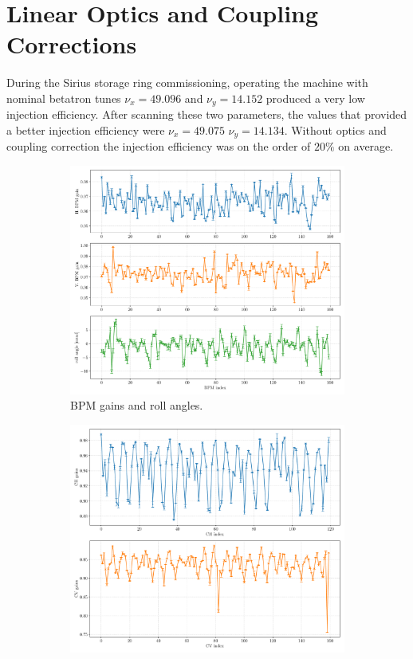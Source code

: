 \section{Linear Optics and Coupling Corrections}
During the Sirius storage ring commissioning, operating the machine with nominal betatron tunes $\nu_x = 49.096$ and $\nu_y = 14.152$ produced a very low injection efficiency. After scanning these two parameters, the values that provided a better injection efficiency were $\nu_x = 49.075$ $\nu_y = 14.134$. Without optics and coupling correction the injection efficiency was on the order of $20\%$ on average.

\begin{figure}
\centering
\begin{subfigure}[t]{0.49\textwidth}
\includegraphics[width=1.0\textwidth]{figures/bpm_gains_iter0_grid.pdf}
    \caption{BPM gains and roll angles.}
    \label{subfig:bpm_fit}
\end{subfigure}
 \begin{subfigure}[t]{0.49\textwidth}
\includegraphics[width=1.0\textwidth]{figures/corr_gains_iter0_grid.pdf}

\end{subfigure}
\end{figure}
